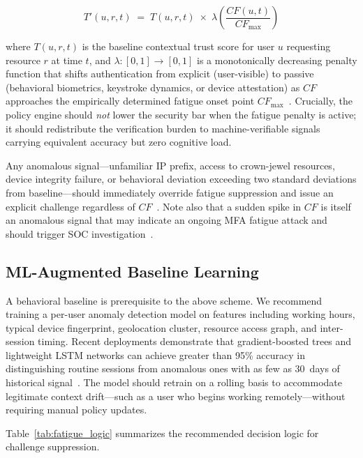 \documentclass[sigconf,nonacm]{acmart}
\begin{document}
\[
  T'(u, r, t) \;=\; T(u, r, t)
    \;\times\; \lambda\!\left(\frac{CF(u,t)}{CF_{\max}}\right)
\]

where $T(u, r, t)$ is the baseline contextual trust score for user $u$
requesting resource $r$ at time $t$, and $\lambda : [0,1] \to [0,1]$ is a
monotonically decreasing penalty function that shifts authentication from
explicit (user-visible) to passive (behavioral biometrics, keystroke dynamics,
or device attestation) as $CF$ approaches the empirically determined fatigue
onset point $CF_{\max}$~\cite{dasgupta_passive_auth2023}. Crucially, the policy
engine should \emph{not} lower the security bar when the fatigue penalty is
active; it should redistribute the verification burden to machine-verifiable
signals carrying equivalent accuracy but zero cognitive load.

Any anomalous signal---unfamiliar IP prefix, access to crown-jewel resources,
device integrity failure, or behavioral deviation exceeding two standard
deviations from baseline---should immediately override fatigue suppression and
issue an explicit challenge regardless of $CF$~\cite{souppaya_zt_guide2023}.
Note also that a sudden spike in $CF$ is itself an anomalous signal that may
indicate an ongoing MFA fatigue attack and should trigger SOC
investigation~\cite{mandiant_mfa_fatigue2023}.

\subsection{ML-Augmented Baseline Learning}
\sloppy

A behavioral baseline is prerequisite to the above scheme. We recommend
training a per-user anomaly detection model on features including working hours,
typical device fingerprint, geolocation cluster, resource access graph, and
inter-session timing. Recent deployments demonstrate that gradient-boosted
trees and lightweight LSTM networks can achieve greater than 95\% accuracy in
distinguishing routine sessions from anomalous ones with as few as 30~days of
historical signal~\cite{kim_ml_zt2024,chen_behavioral2023}. The model should
retrain on a rolling basis to accommodate legitimate context drift---such as a
user who begins working remotely---without requiring manual policy updates.

Table~\ref{tab:fatigue_logic} summarizes the recommended decision logic for
challenge suppression.
\end{document}
